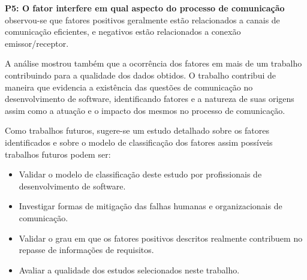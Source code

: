 \textbf{P5: O fator interfere em qual aspecto do processo de comunicação} observou-se que fatores positivos geralmente estão relacionados a canais de comunicação eficientes, e negativos estão relacionados a conexão emissor/receptor.

A análise mostrou também que a ocorrência dos fatores em mais de um trabalho contribuindo para a qualidade dos dados obtidos. O trabalho contribui de maneira que evidencia a existência das questões de comunicação no desenvolvimento de software, identificando fatores e a natureza de suas origens assim como a atuação e o impacto dos mesmos no processo de comunicação.

Como trabalhos futuros, sugere-se um estudo detalhado sobre os fatores identificados e sobre o modelo de classificação dos fatores assim possíveis trabalhos futuros podem ser:

\begin{itemize}
    \item Validar o modelo de classificação deste estudo por profissionais de desenvolvimento de software.
    \item Investigar formas de mitigação das falhas humanas e organizacionais de comunicação.
    \item Validar o grau em que os fatores positivos descritos realmente contribuem no repasse de informações de requisitos.
    \item Avaliar a qualidade dos estudos selecionados neste trabalho.

\end{itemize}


 \newpage 
